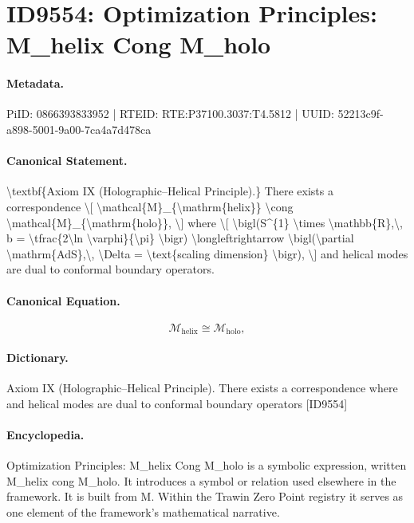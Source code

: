 \section*{ID9554: Optimization Principles: M\_helix Cong M\_holo}
\paragraph{Metadata.}
PiID: 0866393833952 | RTEID: RTE:P37100.3037:T4.5812 | UUID: 52213c9f-a898-5001-9a00-7ca4a7d478ca

\paragraph{Canonical Statement.}
\textbackslash{}textbf\{Axiom IX (Holographic--Helical Principle).\} There exists a correspondence \textbackslash{}[ \textbackslash{}mathcal\{M\}\_\{\textbackslash{}mathrm\{helix\}\} \textbackslash{}cong \textbackslash{}mathcal\{M\}\_\{\textbackslash{}mathrm\{holo\}\}, \textbackslash{}] where \textbackslash{}[ \textbackslash{}bigl(S\textasciicircum{}\{1\} \textbackslash{}times \textbackslash{}mathbb\{R\},\textbackslash{}, b = \textbackslash{}tfrac\{2\textbackslash{}ln \textbackslash{}varphi\}\{\textbackslash{}pi\} \textbackslash{}bigr) \textbackslash{}longleftrightarrow \textbackslash{}bigl(\textbackslash{}partial \textbackslash{}mathrm\{AdS\},\textbackslash{}, \textbackslash{}Delta = \textbackslash{}text\{scaling dimension\} \textbackslash{}bigr), \textbackslash{}] and helical modes are dual to conformal boundary operators.

\paragraph{Canonical Equation.}
\[
\mathcal{M}_{\mathrm{helix}} \cong \mathcal{M}_{\mathrm{holo}},
\]

\paragraph{Dictionary.}
Axiom IX (Holographic--Helical Principle). There exists a correspondence where and helical modes are dual to conformal boundary operators [ID9554]

\paragraph{Encyclopedia.}
Optimization Principles: M\_helix Cong M\_holo is a symbolic expression, written M\_helix cong M\_holo. It introduces a symbol or relation used elsewhere in the framework. It is built from M. Within the Trawin Zero Point registry it serves as one element of the framework's mathematical narrative.
